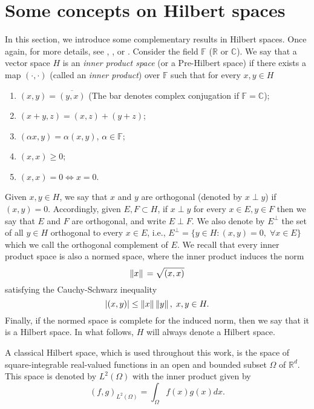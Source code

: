 \section{Some concepts on Hilbert spaces}
In this section, we introduce some complementary results in Hilbert spaces. Once again, for more details, see \cite{rudin1991functional}, \cite{brezis2011functional}, or \cite{arendt2010partielle}. Consider the field \(\mathbb{F}\) (\(\mathbb{R}\) or \(\mathbb{C}\)). We say that a vector space \(H\) is an \textit{inner product space} (or a Pre-Hilbert space) if there exists a map \((\cdot,\cdot)\) (called an \textit{inner product}) over \(\mathbb{F}\) such that for every \(x, y \in H\)
\begin{enumerate}
    \item \((x, y) = \overline{(y, x)}\) (The bar denotes complex conjugation if \(\mathbb{F} = \mathbb{C}\));
    \item \((x+y,z) = (x,z)+(y+z)\);
    \item \((\alpha x, y)=\alpha(x, y)\), \(\alpha \in \mathbb{F}\);
    \item \((x, x) \geq 0\);
    \item \((x, x) = 0 \iff x=0\).
\end{enumerate}
Given \(x, y \in H\), we say that \(x\) and \(y\) are orthogonal (denoted by \(x \perp y\)) if \((x, y) = 0\). Accordingly, given \(E, F \subset H\), if \(x\perp y\) for every \(x \in E, y \in F\) then we say that \(E\) and \(F\) are orthogonal, and write \(E \perp F\). We also denote by \(E^\perp\) the set of all \(y \in H\) orthogonal to every \(x \in E\), i.e., \(E^\perp = \{y \in H: (x, y)=0, \; \forall x \in E\}\) which we call the orthogonal complement of \(E\). We recall that every inner product space is also a normed space, where the inner product induces the norm
\[
\norm*{x} = \sqrt{(x, x)}   
\]
satisfying the Cauchy-Schwarz inequality
\[
\abs{(x, y)} \leq \norm*{x}\norm*{y}, \; x, y \in H.
\]
Finally, if the normed space is complete for the induced norm, then we say that it is a Hilbert space. In what follows, \(H\) will always denote a Hilbert space.

\begin{example}
    A classical Hilbert space, which is used throughout this work, is the space of square-integrable real-valued functions in an open and bounded subset \(\Omega\) of \(\mathbb{R}^d\). This space is denoted by \(L^2(\Omega)\) with the inner product given by
    \[
    (f, g)_{L^2(\Omega)} = \int_\Omega f(x)g(x) dx.
    \]
\end{example}

